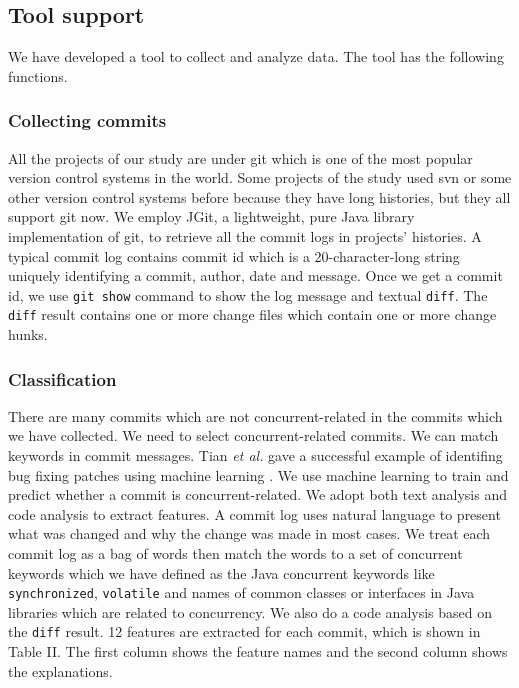 \subsection{Tool support}
\label{sec:method:tool}
We have developed a tool to collect and analyze data. The tool has the following functions.

\subsubsection{Collecting commits}
All the projects of our study are under git which is one of the most popular version control systems in the world. Some projects of the study used svn or some other version control systems before because they have long histories, but they all support git \cite{books/daglib/0022839} now. We employ JGit, a lightweight, pure Java library implementation of git, to retrieve all the commit logs in projects' histories. A typical commit log contains commit id which is a 20-character-long string uniquely identifying a commit, author, date and message. Once we get a commit id, we use \texttt{git show} command to show the log message and textual \texttt{diff}. The \texttt{diff} result contains one or more change files which contain one or more change hunks.

\subsubsection{Classification}
There are many commits which are not concurrent-related in the commits which we have collected. We need to select concurrent-related commits. We can match keywords in commit messages. Tian \emph{et al.} gave a successful example of identifing bug fixing patches using machine learning \cite{conf/icse/TianLL12}. We use machine learning to train and predict whether a commit is concurrent-related. We adopt both text analysis and code analysis to extract features. A commit log uses natural language to present what was changed and why the change was made in most cases. We treat each commit log as a bag of words then match the words to a set of concurrent keywords which we have defined as the Java concurrent keywords like \texttt{synchronized}, \texttt{volatile} and names of common classes or interfaces in Java libraries which are related to concurrency. We also do a code analysis based on the \texttt{diff} result. 12 features are extracted for each commit, which is shown in Table II. The first column shows the feature names and the second column shows the explanations.

